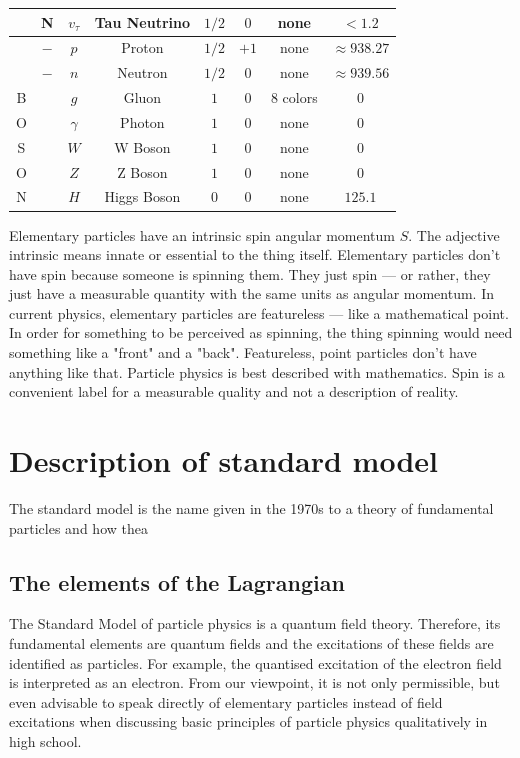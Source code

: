 \begin{table}[h!]
\begin{center}
\begin{tabular}{|c|c|c|c|c|c|c|c||}
          & N & $v_\tau$ & Tau Neutrino & $1/2$ & $0$ & none & $<1.2$ \\
        \hline
          & $-$ & $p$ & Proton & $1/2$ & $+1$ & none & $\approx 938.27$ \\
        \hline
          & $- $& $n$ & Neutron & $1/2$ & $0$ & none & $\approx 939.56$ \\
        \hline
        B & & $g$ & Gluon & $1$ & $0$ & 8 colors & $0$ \\
        \hline
        O & & $\gamma$ & Photon & $1$ & $0$ & none & $0$ \\
        \hline
        S & & $W$ & W Boson & $1$ & $0$ & none & $0$ \\
        \hline
        O & & $Z$ & Z Boson & $1$ & $0$ & none & $0$ \\
        \hline
        N & & $H$ & Higgs Boson & $0$ & $0$ & none & $125.1$ \\
        \hline
        \end{tabular}
  \end{center}
\end{table}

Elementary particles have an intrinsic spin angular momentum $S$. The adjective intrinsic means innate or essential to the thing itself. Elementary particles don't have spin because someone is spinning them. They just spin — or rather, they just have a measurable quantity with the same units as angular momentum. In current physics, elementary particles are featureless — like a mathematical point. In order for something to be perceived as spinning, the thing spinning would need something like a "front" and a "back". Featureless, point particles don't have anything like that. Particle physics is best described with mathematics. Spin is a convenient label for a measurable quality and not a description of reality.


\section{Description of standard model}

The standard model is the name given in the 1970s to a theory of fundamental particles and how thea
\subsection{The elements of the Lagrangian}

The Standard Model of particle physics is a quantum field theory. Therefore, its fundamental elements are quantum fields and the excitations of these fields are identified as particles. For example, the quantised excitation of the electron field is interpreted as an electron. From our viewpoint, it is not only permissible, but even advisable to speak directly of elementary particles instead of field excitations when discussing basic principles of particle physics qualitatively in high school.

